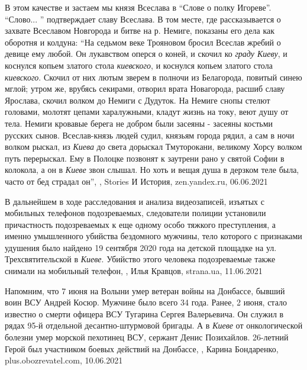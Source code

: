 В этом качестве и застаем мы князя Всеслава в \enquote{Слове о полку Игореве}.
\enquote{Слово... } подтверждает славу Всеслава. В том месте, где
рассказывается о захвате Всеславом Новгорода и битве на р. Немиге, показаны его
дела как оборотня и колдуна: \enquote{На седьмом веке Трояновом бросил Всеслав
жребий о девице ему любой.  Он лукавством оперся о коней, и скочил ко
\emph{граду Киеву}, и коснулся копьем златого стола \emph{киевского}, и
коснулся копьем златого стола \emph{киевского}. Скочил от них лютым зверем в
полночи из Белагорода, повитый синею мглой; утром же, врубясь секирами, отворил
врата Новагорода, расшиб славу Ярослава, скочил волком до Немиги с Дудуток.  На
Немиге снопы стелют головами, молотят цепами харалужными, кладут жизнь на току,
веют душу от тела.  Немиги кровавые берега не добром были засеяны - засеяны
костьми русских сынов.  Всеслав-князь людей судил, князьям города рядил, а сам
в ночи волком рыскал, из \emph{Киева} до света дорыскал Тмуторокани, великому
Хорсу волком путь перерыскал.  Ему в Полоцке позвонят к заутрени рано у святой
Софии в колокола, а он в \emph{Киеве} звон слышал. Но хоть и вещая душа в
дерзком теле была, часто от бед страдал он},
, Stories И История, zen.yandex.ru, 06.06.2021

В дальнейшем в ходе расследования и анализа видеозаписей, изъятых с мобильных
телефонов подозреваемых, следователи полиции установили причастность
подозреваемых к еще одному особо тяжкого преступления, а именно умышленного
убийства бездомного мужчины, тело которого с признаками удушения было найдено
19 сентября 2020 года на детской площадке на ул. Трехсвятительской в
\emph{Киеве}. Убийство этого человека подозреваемые также снимали на мобильный
телефон,
, Илья Кравцов, strana.ua, 11.06.2021

Напомним, что 7 июня на Волыни умер ветеран войны на Донбассе, бывший воин ВСУ
Андрей Косюр. Мужчине было всего 34 года. Ранее, 2 июня, стало известно о
смерти офицера ВСУ Тугарина Сергея Валерьевича. Он служил в рядах 95-й
отдельной десантно-штурмовой бригады. А в \emph{Киеве} от онкологической
болезни умер морской пехотинец ВСУ, сержант Денис Позихайлов. 26-летний Герой
был участником боевых действий на Донбассе,
, 
Карина Бондаренко, plus.obozrevatel.com, 10.06.2021

